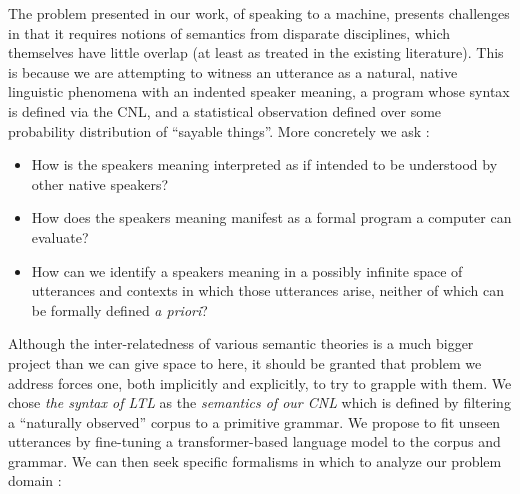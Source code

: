 \documentclass[a4paper, 11pt]{article}
\begin{document}
The problem presented in our work, of speaking to a machine, presents challenges
in that it requires notions of semantics from disparate disciplines, which
themselves have little overlap (at least as treated in the existing literature).
This is because we are attempting to witness an utterance as a natural, native
linguistic phenomena with an indented speaker meaning, a program whose syntax is
defined via the CNL, and a statistical observation defined over some probability
distribution of ``sayable things''. More concretely we ask :

\begin{itemize}
\item How is the speakers meaning interpreted as if intended to be understood by
  other native speakers?
\item How does the speakers meaning manifest as a formal program a computer can
  evaluate?
\item How can we identify a speakers meaning in a possibly infinite space of
  utterances and contexts in which those utterances arise, neither of which can
  be formally defined \emph{a priori}?
\end{itemize}

Although the inter-relatedness of various semantic theories is a much bigger
project than we can give space to here, it should be granted that problem we
address forces one, both implicitly and explicitly, to try to grapple with them.
We chose \emph{the syntax of LTL} as the \emph{semantics of our CNL} which is
defined by filtering a ``naturally observed'' corpus to a primitive grammar. We
propose to fit unseen utterances by fine-tuning a transformer-based language
model to the corpus and grammar. We can then seek specific formalisms in which
to analyze our problem domain :
\end{document}
